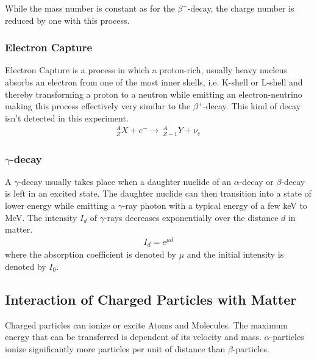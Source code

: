 \documentclass[12pt]{article}
\begin{document}
While the mass number is constant as for the $\beta^-$-decay, the charge number is reduced by one with this process.

\subsubsection{Electron  Capture}
Electron Capture is a process in which a proton-rich, usually heavy nucleus 
absorbs an electron from one of the most inner shells, i.e. K-shell or L-shell and thereby transforming a proton to a neutron while emitting an electron-neutrino making this process effectively very similar to the $\beta^+$-decay.
This kind of decay isn't detected in this experiment.
\begin{align}
{}_Z^A X + e^- \rightarrow\ {}_{Z-1}^A Y + \nu_e
\end{align}



\subsubsection{$\gamma$-decay}
A $\gamma$-decay usually takes place when a daughter nuclide of an $\alpha$-decay or $\beta$-decay is left in an excited state. The daughter nuclide can then transition into a state of lower energy while emitting a $\gamma$-ray photon with a typical energy of a few keV to MeV.
The intensity $I_d$ of $\gamma$-rays decreases exponentially over the distance $d$ in matter.
\begin{align}
I_d=e^{\mu d}
\end{align}
where the absorption coefficient is denoted by $\mu$ and the initial intensity is denoted by $I_0$.






\subsection{Interaction of Charged Particles with Matter}
Charged particles can ionize or excite Atoms and Molecules. The maximum energy that can be transferred is dependent of its velocity and mass.
$\alpha$-particles ionize significantly more particles per unit of distance than $\beta$-particles.
\end{document}
